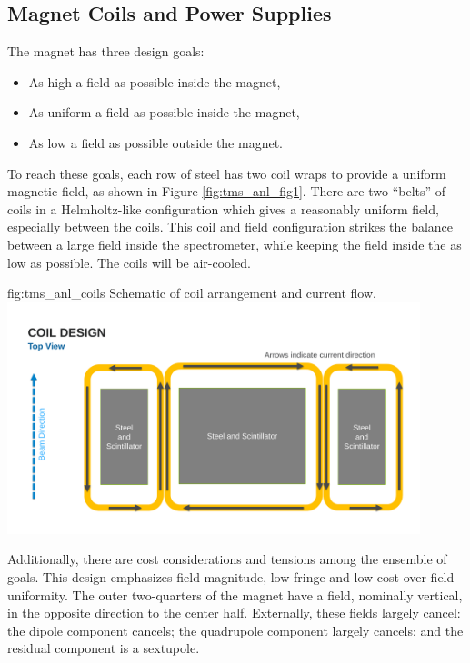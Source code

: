 \subsection{Magnet Coils and Power Supplies}
\label{sec:tms-des-coil}

The magnet has three design goals:
\begin{itemize}
    \item As high a field as possible inside the magnet,
    \item As uniform a field as possible inside the magnet,
    \item As low a field as possible outside the magnet.
\end{itemize}

To reach these goals, each row of steel has two coil wraps to provide a uniform magnetic field, as shown in Figure \ref{fig:tms_anl_fig1}.  
There are two “belts” of coils in a Helmholtz-like configuration which gives a reasonably uniform field, especially between the coils.   This coil and field configuration strikes the balance between a large field inside the spectrometer, while keeping the field inside the  as low as possible. The coils will be air-cooled.  

\begin{dunefigure}{fig:tms_anl_coils}
{Schematic of coil arrangement and current flow.}
\includegraphics[width=0.9\textwidth]{graphics/tms/Detector/tms_anl_coils.pdf}
\end{dunefigure}

Additionally, there are cost considerations and 
tensions among the ensemble of goals. This design emphasizes
field magnitude, low fringe and low cost over field uniformity. The outer two-quarters of the magnet have a field, nominally vertical, in the opposite direction to the center half. Externally, these fields largely cancel: the dipole component cancels; the quadrupole component largely cancels; and the residual component is a sextupole.

